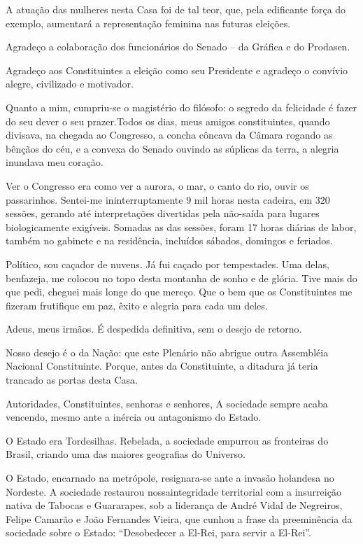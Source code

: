 A atuação das mulheres nesta Casa foi de tal teor, que, pela edificante
força do exemplo, aumentará a representação feminina nas futuras
eleições.

Agradeço a colaboração dos funcionários do Senado -- da Gráfica e do
Prodasen.

Agradeço aos Constituintes a eleição como seu Presidente e agradeço o
convívio alegre, civilizado e motivador.

Quanto a mim, cumpriu-se o magistério do filósofo: o segredo da
felicidade é fazer do seu dever o seu prazer.Todos os dias, meus amigos
constituintes, quando divisava, na chegada ao Congresso, a concha
côncava da Câmara rogando as bênçãos do céu, e a convexa do Senado
ouvindo as súplicas da terra, a alegria inundava meu coração.

Ver o Congresso era como ver a aurora, o mar, o canto do rio, ouvir os
passarinhos. Sentei-me ininterruptamente 9 mil horas nesta cadeira, em
320 sessões, gerando até interpretações divertidas pela não-saída para
lugares biologicamente exigíveis. Somadas as das sessões, foram 17 horas
diárias de labor, também no gabinete e na residência, incluídos sábados,
domingos e feriados.

Político, sou caçador de nuvens. Já fui caçado por tempestades. Uma
delas, benfazeja, me colocou no topo desta montanha de sonho e de
glória. Tive mais do que pedi, cheguei mais longe do que mereço. Que o
bem que os Constituintes me fizeram frutifique em paz, êxito e alegria
para cada um deles.

Adeus, meus irmãos. É despedida definitiva, sem o desejo de retorno.

Nosso desejo é o da Nação: que este Plenário não abrigue outra
Assembléia Nacional Constituinte. Porque, antes da Constituinte, a
ditadura já teria trancado as portas desta Casa.

Autoridades, Constituintes, senhoras e senhores, A sociedade sempre
acaba vencendo, mesmo ante a inércia ou antagonismo do Estado.

O Estado era Tordesilhas. Rebelada, a sociedade empurrou as fronteiras
do Brasil, criando uma das maiores geografias do Universo.

O Estado, encarnado na metrópole, resignara-se ante a invasão holandesa
no Nordeste. A sociedade restaurou nossaintegridade territorial com a
insurreição nativa de Tabocas e Guararapes, sob a liderança de André
Vidal de Negreiros, Felipe Camarão e João Fernandes Vieira, que cunhou a
frase da preeminência da sociedade sobre o Estado: ``Desobedecer a
El-Rei, para servir a El-Rei''.

